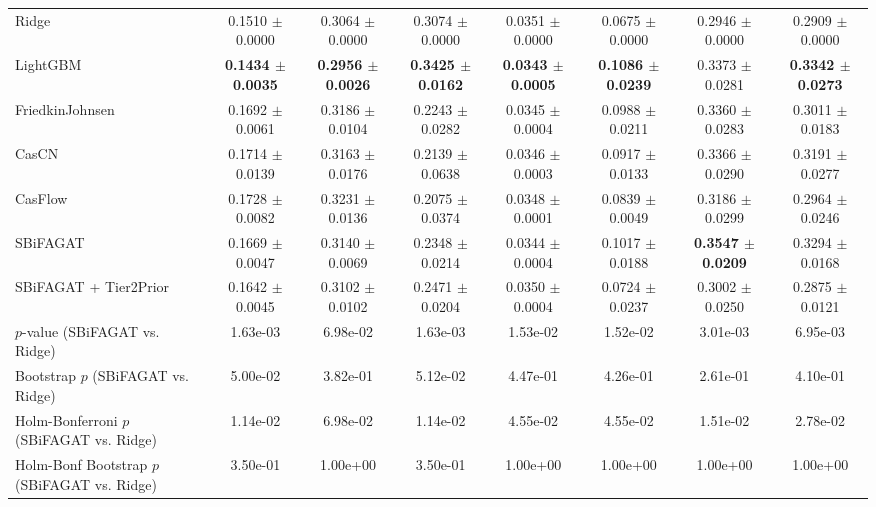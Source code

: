 \begin{table}[t]
{\begin{tabular}{lccccccc}
Ridge & 0.1510 $\pm$ 0.0000 & 0.3064 $\pm$ 0.0000 & 0.3074 $\pm$ 0.0000 & 0.0351 $\pm$ 0.0000 & 0.0675 $\pm$ 0.0000 & 0.2946 $\pm$ 0.0000 & 0.2909 $\pm$ 0.0000 \\
LightGBM & \textbf{0.1434 $\pm$ 0.0035} & \textbf{0.2956 $\pm$ 0.0026} & \textbf{0.3425 $\pm$ 0.0162} & \textbf{0.0343 $\pm$ 0.0005} & \textbf{0.1086 $\pm$ 0.0239} & 0.3373 $\pm$ 0.0281 & \textbf{0.3342 $\pm$ 0.0273} \\
FriedkinJohnsen & 0.1692 $\pm$ 0.0061 & 0.3186 $\pm$ 0.0104 & 0.2243 $\pm$ 0.0282 & 0.0345 $\pm$ 0.0004 & 0.0988 $\pm$ 0.0211 & 0.3360 $\pm$ 0.0283 & 0.3011 $\pm$ 0.0183 \\
CasCN & 0.1714 $\pm$ 0.0139 & 0.3163 $\pm$ 0.0176 & 0.2139 $\pm$ 0.0638 & 0.0346 $\pm$ 0.0003 & 0.0917 $\pm$ 0.0133 & 0.3366 $\pm$ 0.0290 & 0.3191 $\pm$ 0.0277 \\
CasFlow & 0.1728 $\pm$ 0.0082 & 0.3231 $\pm$ 0.0136 & 0.2075 $\pm$ 0.0374 & 0.0348 $\pm$ 0.0001 & 0.0839 $\pm$ 0.0049 & 0.3186 $\pm$ 0.0299 & 0.2964 $\pm$ 0.0246 \\
SBiFAGAT & 0.1669 $\pm$ 0.0047 & 0.3140 $\pm$ 0.0069 & 0.2348 $\pm$ 0.0214 & 0.0344 $\pm$ 0.0004 & 0.1017 $\pm$ 0.0188 & \textbf{0.3547 $\pm$ 0.0209} & 0.3294 $\pm$ 0.0168 \\
SBiFAGAT + Tier2Prior & 0.1642 $\pm$ 0.0045 & 0.3102 $\pm$ 0.0102 & 0.2471 $\pm$ 0.0204 & 0.0350 $\pm$ 0.0004 & 0.0724 $\pm$ 0.0237 & 0.3002 $\pm$ 0.0250 & 0.2875 $\pm$ 0.0121 \\
\midrule
$p$-value (SBiFAGAT vs. Ridge) & 1.63e-03 & 6.98e-02 & 1.63e-03 & 1.53e-02 & 1.52e-02 & 3.01e-03 & 6.95e-03 \\
Bootstrap $p$ (SBiFAGAT vs. Ridge) & 5.00e-02 & 3.82e-01 & 5.12e-02 & 4.47e-01 & 4.26e-01 & 2.61e-01 & 4.10e-01 \\
Holm-Bonferroni $p$ (SBiFAGAT vs. Ridge) & 1.14e-02 & 6.98e-02 & 1.14e-02 & 4.55e-02 & 4.55e-02 & 1.51e-02 & 2.78e-02 \\
Holm-Bonf Bootstrap $p$ (SBiFAGAT vs. Ridge) & 3.50e-01 & 1.00e+00 & 3.50e-01 & 1.00e+00 & 1.00e+00 & 1.00e+00 & 1.00e+00 \\
\bottomrule
\end{tabular}
}
\end{table}
